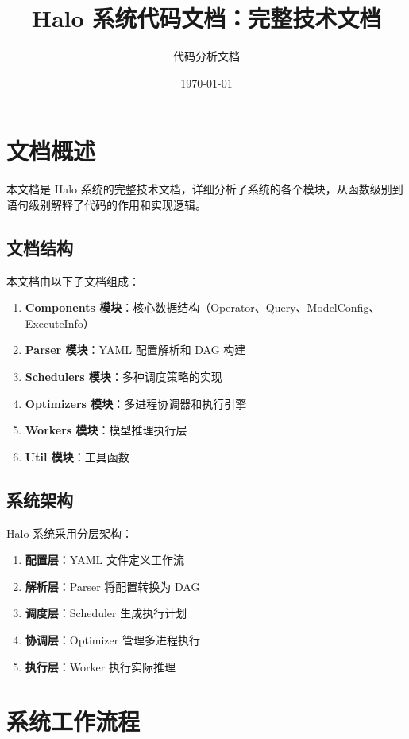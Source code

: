 \documentclass[12pt,a4paper]{article}
\title{Halo 系统代码文档：完整技术文档}
\author{代码分析文档}
\date{\today}
\begin{document}
\maketitle

\tableofcontents
\newpage

\section{文档概述}

本文档是 Halo 系统的完整技术文档，详细分析了系统的各个模块，从函数级别到语句级别解释了代码的作用和实现逻辑。

\subsection{文档结构}

本文档由以下子文档组成：

\begin{enumerate}
    \item \textbf{Components 模块}：核心数据结构（Operator、Query、ModelConfig、ExecuteInfo）
    \item \textbf{Parser 模块}：YAML 配置解析和 DAG 构建
    \item \textbf{Schedulers 模块}：多种调度策略的实现
    \item \textbf{Optimizers 模块}：多进程协调器和执行引擎
    \item \textbf{Workers 模块}：模型推理执行层
    \item \textbf{Util 模块}：工具函数
\end{enumerate}

\subsection{系统架构}

Halo 系统采用分层架构：

\begin{enumerate}
    \item \textbf{配置层}：YAML 文件定义工作流
    \item \textbf{解析层}：Parser 将配置转换为 DAG
    \item \textbf{调度层}：Scheduler 生成执行计划
    \item \textbf{协调层}：Optimizer 管理多进程执行
    \item \textbf{执行层}：Worker 执行实际推理
\end{enumerate}

\section{系统工作流程}
\end{document}

